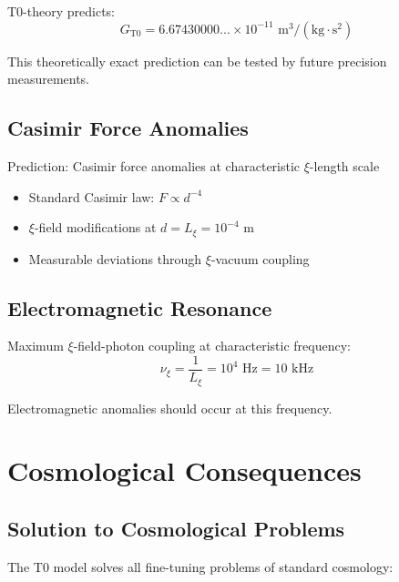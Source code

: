 \documentclass[12pt,a4paper]{article}
\begin{document}
	T0-theory predicts:
	\begin{equation}
		G_{\text{T0}} = 6.67430000... \times 10^{-11} \text{ m}^3/(\text{kg} \cdot \text{s}^2)
	\end{equation}
	
	This theoretically exact prediction can be tested by future precision measurements.
	
	\subsection{Casimir Force Anomalies}
	
	\begin{experiment}
		Prediction: Casimir force anomalies at characteristic $\xi$-length scale
		\begin{itemize}
			\item Standard Casimir law: $F \propto d^{-4}$
			\item $\xi$-field modifications at $d = L_\xi = 10^{-4}$ m
			\item Measurable deviations through $\xi$-vacuum coupling
		\end{itemize}
	\end{experiment}
	
	\subsection{Electromagnetic Resonance}
	
	Maximum $\xi$-field-photon coupling at characteristic frequency:
	\begin{equation}
		\nu_\xi = \frac{1}{L_\xi} = 10^{4} \text{ Hz} = 10 \text{ kHz}
	\end{equation}
	
	Electromagnetic anomalies should occur at this frequency.
	
	\section{Cosmological Consequences}
	
	\subsection{Solution to Cosmological Problems}
	
	The T0 model solves all fine-tuning problems of standard cosmology:
	
\end{document}
